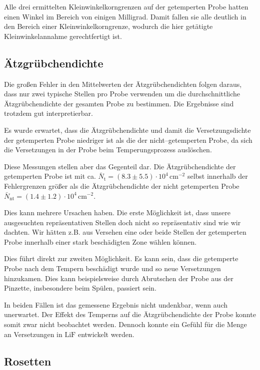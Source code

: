 \documentclass[12pt,a4paper]{scrartcl}
\numberwithin{equation}{section} %
\begin{document}
Alle drei ermittelten Kleinwinkelkorngrenzen auf der getemperten Probe hatten einen Winkel im Bereich von einigen Milligrad. Damit fallen sie alle deutlich in den Bereich einer Kleinwinkelkorngrenze, wodurch die hier getätigte Kleinwinkelannahme gerechtfertigt ist.

\hypertarget{uxe4tzgruxfcbchendichte-1}{%
\subsection{Ätzgrübchendichte}\label{uxe4tzgruxfcbchendichte-1}}

Die großen Fehler in den Mittelwerten der Ätzgrübchendichten folgen daraus, dass nur zwei typische Stellen pro Probe verwenden um die durchschnittliche Ätzgrübchendichte der gesamten Probe zu bestimmen. Die Ergebnisse sind trotzdem gut interpretierbar.

Es wurde erwartet, dass die Ätzgrübchendichte und damit die Versetzungsdichte der getemperten Probe niedriger ist als die der nicht--getemperten Probe, da sich die Versetzungen in der Probe beim Temperungsprozess auslöschen. \cite{Newey}

Diese Messungen stellen aber das Gegenteil dar. Die Ätzgrübchendichte der getemperten Probe ist mit ca. $\bar N_\mathrm{t}=(8.3\pm 5.5) \cdot 10^4 \mathrm{\, cm^{-2}}$ selbst innerhalb der Fehlergrenzen größer als die Ätzgrübchendichte der nicht getemperten Probe $\bar N_\mathrm{nt}=(1.4 \pm 1.2) \cdot 10^4 \mathrm{\, cm^{-2}}$.

Dies kann mehrere Ursachen haben. Die erste Möglichkeit ist, dass unsere ausgesuchten repräsentativen Stellen doch nicht so repräsentativ sind wie wir dachten. Wir hätten z.B. aus Versehen eine oder beide Stellen der getemperten Probe innerhalb einer stark beschädigten Zone wählen können.

Dies führt direkt zur zweiten Möglichkeit. Es kann sein, dass die getemperte Probe nach dem Tempern beschädigt wurde und so neue Versetzungen hinzukamen. Dies kann beispielsweise durch Abrutschen der Probe aus der Pinzette, insbesondere beim Spülen, passiert sein.

In beiden Fällen ist das gemessene Ergebnis nicht undenkbar, wenn auch unerwartet. Der Effekt des Temperns auf die Ätzgrübchendichte der Probe konnte somit zwar nicht beobachtet werden. Dennoch konnte ein Gefühl für die Menge an Versetzungen in $\mathrm{LiF}$ entwickelt werden.

\hypertarget{rosetten}{%
\subsection{Rosetten}\label{rosetten}}
\end{document}
